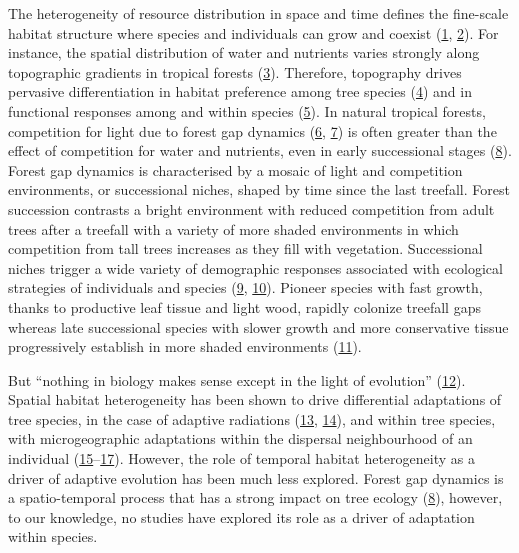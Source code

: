\documentclass[
]{article}
\begin{document}
The heterogeneity of resource distribution in space and time defines the fine-scale habitat structure where species and individuals can grow and coexist (\protect\hyperlink{ref-Lortie2004a}{1}, \protect\hyperlink{ref-weiher_assembly_1995}{2}).
For instance, the spatial distribution of water and nutrients varies strongly along topographic gradients in tropical forests (\protect\hyperlink{ref-Ferry2010}{3}).
Therefore, topography drives pervasive differentiation in habitat preference among tree species (\protect\hyperlink{ref-Engelbrecht2007}{4})
and in functional responses among and within species (\protect\hyperlink{ref-Schmitt2020}{5}).
In natural tropical forests, competition for light due to forest gap dynamics (\protect\hyperlink{ref-Hubbell1999}{6}, \protect\hyperlink{ref-Molino2001}{7})
is often greater than the effect of competition for water and nutrients, even in early successional stages (\protect\hyperlink{ref-VanBreugel2012}{8}).
Forest gap dynamics is characterised by a mosaic of light and competition environments,
or successional niches, shaped by time since the last treefall.
Forest succession contrasts a bright environment with reduced competition from adult trees after a treefall with a variety of more shaded environments in which competition from tall trees increases as they fill with vegetation.
Successional niches trigger a wide variety of demographic responses associated with ecological strategies of individuals and species (\protect\hyperlink{ref-Herault2010}{9}, \protect\hyperlink{ref-Ruger2009}{10}).
Pioneer species with fast growth, thanks to productive leaf tissue and light wood, rapidly colonize treefall gaps whereas late successional species with slower growth and more conservative tissue progressively establish in more shaded environments (\protect\hyperlink{ref-Craven2015}{11}).

But ``nothing in biology makes sense except in the light of evolution'' (\protect\hyperlink{ref-Dobzhansky1973}{12}).
Spatial habitat heterogeneity has been shown to drive differential adaptations of tree species,
in the case of adaptive radiations (\protect\hyperlink{ref-Paun2016}{13}, \protect\hyperlink{ref-Pillon2014}{14}),
and within tree species, with microgeographic adaptations within the dispersal neighbourhood of an individual (\protect\hyperlink{ref-Brousseau2015}{15}--\protect\hyperlink{ref-Team2013}{17}).
However, the role of temporal habitat heterogeneity as a driver of adaptive evolution has been much less explored.
Forest gap dynamics is a spatio-temporal process that has a strong impact on tree ecology (\protect\hyperlink{ref-VanBreugel2012}{8}),
however, to our knowledge, no studies have explored its role as a driver of adaptation within species.
\end{document}
